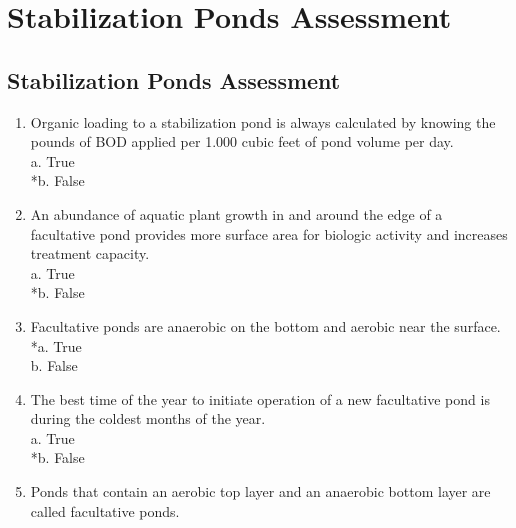 
\chapter{Stabilization Ponds Assessment}

\section*{Stabilization Ponds Assessment}



\begin{enumerate}

\item  Organic loading to a stabilization pond is always calculated by knowing the pounds of BOD applied per 1.000 cubic feet of pond volume per day.\\


a. True \\

*b. False \\


\item  An abundance of aquatic plant growth in and around the edge of a facultative pond provides more surface area for biologic activity and increases treatment capacity.\\


a. True \\

*b. False \\


\item  Facultative ponds are anaerobic on the bottom and aerobic near the surface.\\


*a. True \\

b. False \\


\item  The best time of the year to initiate operation of a new facultative pond is during the coldest months of the year.\\


a. True \\

*b. False \\


\item  Ponds that contain an aerobic top layer and an anaerobic bottom layer are called facultative ponds.\\



\end{enumerate}
